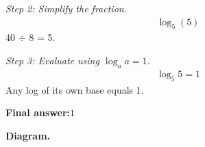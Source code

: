 \documentclass[11pt]{article}
\begin{document}
\textit{Step 2: Simplify the fraction.}
\[\begin{gathered}
\log_5(5)
\end{gathered}\]
40 $\div$ 8 = 5.

\textit{Step 3: Evaluate using \( \log_a a = 1 \).}
\[\begin{gathered}
\log_5 5 = 1
\end{gathered}\]
Any log of its own base equals 1.

\begin{answerbox}
\textbf{Final answer:}\quad \(\displaystyle  1 \)
\end{answerbox}
\textbf{Diagram.}

\begin{center}
\end{center}
\end{document}
